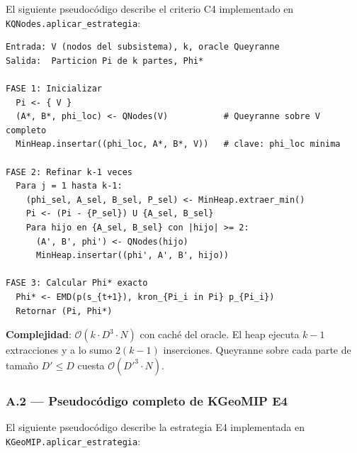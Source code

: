 El siguiente pseudocódigo describe el criterio C4 implementado en
\texttt{KQNodes.aplicar\_estrategia}:

\begin{verbatim}
Entrada: V (nodos del subsistema), k, oracle Queyranne
Salida:  Particion Pi de k partes, Phi*

FASE 1: Inicializar
  Pi <- { V }
  (A*, B*, phi_loc) <- QNodes(V)           # Queyranne sobre V completo
  MinHeap.insertar((phi_loc, A*, B*, V))   # clave: phi_loc minima

FASE 2: Refinar k-1 veces
  Para j = 1 hasta k-1:
    (phi_sel, A_sel, B_sel, P_sel) <- MinHeap.extraer_min()
    Pi <- (Pi - {P_sel}) U {A_sel, B_sel}
    Para hijo en {A_sel, B_sel} con |hijo| >= 2:
      (A', B', phi') <- QNodes(hijo)
      MinHeap.insertar((phi', A', B', hijo))

FASE 3: Calcular Phi* exacto
  Phi* <- EMD(p(s_{t+1}), kron_{Pi_i in Pi} p_{Pi_i})
  Retornar (Pi, Phi*)
\end{verbatim}

\textbf{Complejidad}: $\mathcal{O}(k \cdot D^3 \cdot N)$ con caché del oracle.
El heap ejecuta $k{-}1$ extracciones y a lo sumo $2(k{-}1)$ inserciones.
Queyranne sobre cada parte de tamaño $D' \leq D$ cuesta $\mathcal{O}(D'^3 \cdot N)$.

\subsubsection*{A.2 — Pseudocódigo completo de KGeoMIP E4}

El siguiente pseudocódigo describe la estrategia E4 implementada en
\texttt{KGeoMIP.aplicar\_estrategia}:

